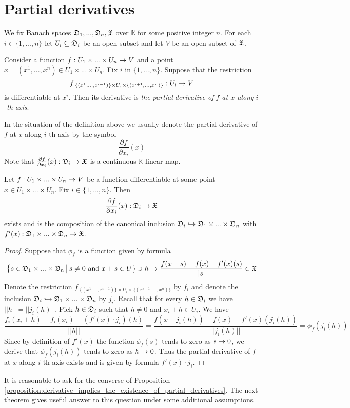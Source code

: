 \section{Partial derivatives}
\noindent
We fix Banach spaces ${\mathfrak D}_1,...,{\mathfrak D}_n,{\mathfrak X}$ over $\mathbb{K}$ for some positive integer $n$. For each $i\in \{1,...,n\}$ let $U_i\subseteq {\mathfrak D}_i$ be an open subset and let $V$ be an open subset of ${\mathfrak X}$.

\begin{definition}
Consider a function $f:U_1\times ... \times U_n\rightarrow V$ and a point $x = (x^1,...,x^n) \in U_1\times ...\times U_n$. Fix $i$ in $\{1,...,n\}$. Suppose that the restriction 
$$f_{\mid \{(x^1,...,x^{i-1})\}\times U_i\times \{(x^{i+1},...,x^n)\}}:U_i\rightarrow V$$
is differentiable at $x^i$. Then its derivative is \textit{the partial derivative of $f$ at $x$ along $i$-th axis}. 
\end{definition}

\begin{remark}\label{remark:notation_for_partial_derivatives}
In the situation of the definition above we usually denote the partial derivative of $f$ at $x$ along $i$-th axis by the symbol
$$\frac{\partial f}{\partial x_i}(x)$$
Note that $\frac{\partial f}{\partial x_i}(x):{\mathfrak D}_i\rightarrow {\mathfrak X}$ is a continuous $\mathbb{K}$-linear map.
\end{remark}

\begin{proposition}\label{proposition:derivative_implies_the_existence_of_partial_derivatives}
Let $f:U_1\times ... \times U_n\rightarrow V$ be a function differentiable at some point $x \in U_1\times ...\times U_n$. Fix $i\in \{1,...,n\}$. Then
$$\frac{\partial f}{\partial x_i}(x):{\mathfrak D}_i\rightarrow {\mathfrak X}$$
exists and is the composition of the canonical inclusion ${\mathfrak D}_i \hookrightarrow {\mathfrak D}_1\times ... \times {\mathfrak D}_n$ with $f'(x):{\mathfrak D}_1\times ... \times {\mathfrak D}_n \rightarrow {\mathfrak X}$.
\end{proposition}
\begin{proof}
Suppose that $\phi_f$ is a function given by formula
$$\big\{s\in {\mathfrak D}_1\times ...\times {\mathfrak D}_n\,\big|\,s\neq 0\mbox{ and }x+s\in U\big\} \ni h\mapsto \frac{f(x+s) - f(x) - f'(x)(s)}{||s||} \in {\mathfrak X}$$
Denote the restriction $f_{\mid \{(x^1,...,x^{i-1})\}\times U_i\times \{(x^{i+1},...,x^n)\}}$ by $f_i$ and denote the inclusion ${\mathfrak D}_i \hookrightarrow {\mathfrak D}_1\times ... \times {\mathfrak D}_n$ by $j_i$. Recall that for every $h\in {\mathfrak D}_i$ we have $||h|| = ||j_i(h)||$. Pick $h \in {\mathfrak D}_i$ such that $h\neq 0$ and $x_i+h \in U_i$. We have
$$\frac{f_i(x_i + h) - f_i(x_i) - \left(f'(x)\cdot j_i\right)(h)}{||h||} = \frac{f\left(x + j_i(h)\right) - f(x) - f'(x)\left(j_i(h)\right)}{||j_i(h)||} = \phi_f\left(j_i(h)\right)$$
Since by definition of $f'(x)$ the function $\phi_f(s)$ tends to zero as $s\rightarrow 0$, we derive that $\phi_f\left(j_i(h)\right)$ tends to zero as $h\rightarrow 0$. Thus the partial derivative of $f$ at $x$ along $i$-th axis exists and is given by formula $f'(x)\cdot j_i$.
\end{proof}
\noindent
It is reasonable to ask for the converse of Proposition \ref{proposition:derivative_implies_the_existence_of_partial_derivatives}. The next theorem gives useful answer to this question under some additional assumptions.

